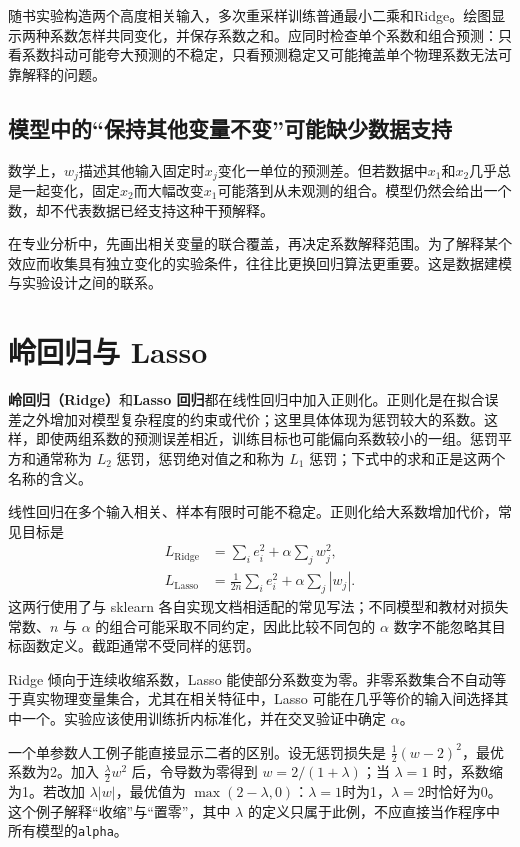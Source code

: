 随书实验构造两个高度相关输入，多次重采样训练普通最小二乘和Ridge。绘图显示两种系数怎样共同变化，并保存系数之和。应同时检查单个系数和组合预测：只看系数抖动可能夸大预测的不稳定，只看预测稳定又可能掩盖单个物理系数无法可靠解释的问题。


\subsection{模型中的“保持其他变量不变”可能缺少数据支持}
数学上，$w_j$描述其他输入固定时$x_j$变化一单位的预测差。但若数据中$x_1$和$x_2$几乎总是一起变化，固定$x_2$而大幅改变$x_1$可能落到从未观测的组合。模型仍然会给出一个数，却不代表数据已经支持这种干预解释。

在专业分析中，先画出相关变量的联合覆盖，再决定系数解释范围。为了解释某个效应而收集具有独立变化的实验条件，往往比更换回归算法更重要。这是数据建模与实验设计之间的联系。

\section{岭回归与 Lasso}

\textbf{岭回归（Ridge）}和\textbf{Lasso 回归}都在线性回归中加入正则化。正则化是在拟合误差之外增加对模型复杂程度的约束或代价；这里具体体现为惩罚较大的系数。这样，即使两组系数的预测误差相近，训练目标也可能偏向系数较小的一组。惩罚平方和通常称为 $L_2$ 惩罚，惩罚绝对值之和称为 $L_1$ 惩罚；下式中的求和正是这两个名称的含义。

线性回归在多个输入相关、样本有限时可能不稳定。正则化给大系数增加代价，常见目标是
\begin{align}
L_{\mathrm{Ridge}}&=\sum_i e_i^2+\alpha\sum_jw_j^2,\\
L_{\mathrm{Lasso}}&=\frac{1}{2n}\sum_i e_i^2+\alpha\sum_j|w_j|.
\end{align}
这两行使用了与 sklearn 各自实现文档相适配的常见写法；不同模型和教材对损失常数、$n$ 与 $\alpha$ 的组合可能采取不同约定，因此比较不同包的 $\alpha$ 数字不能忽略其目标函数定义。截距通常不受同样的惩罚。

Ridge 倾向于连续收缩系数，Lasso 能使部分系数变为零。非零系数集合不自动等于真实物理变量集合，尤其在相关特征中，Lasso 可能在几乎等价的输入间选择其中一个。实验应该使用训练折内标准化，并在交叉验证中确定 $\alpha$。

一个单参数人工例子能直接显示二者的区别。设无惩罚损失是 $\tfrac12(w-2)^2$，最优系数为2。加入 $\tfrac\lambda2w^2$ 后，令导数为零得到 $w=2/(1+\lambda)$；当 $\lambda=1$ 时，系数缩为1。若改加 $\lambda|w|$，最优值为 $\max(2-\lambda,0)$：$\lambda=1$时为1，$\lambda=2$时恰好为0。这个例子解释“收缩”与“置零”，其中 $\lambda$ 的定义只属于此例，不应直接当作程序中所有模型的\texttt{alpha}。

